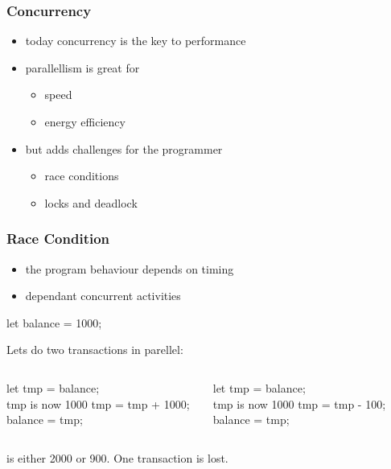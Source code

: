 \begin{frame}[fragile] \frametitle{Concurrency}
\begin{itemize}
  \item today concurrency is the key to performance
  \item parallellism is great for
  \begin{itemize}
    \item speed
    \item energy efficiency
  \end{itemize}
  \item but adds challenges for the programmer
  \begin{itemize}
    \item race conditions
    \item locks and deadlock
  \end{itemize}
\end{itemize}
\end{frame}

\begin{frame}[fragile] \frametitle{Race Condition}
\begin{itemize}
  \item the program behaviour depends on timing
  \item dependant concurrent activities
\end{itemize}
\vspace{3mm}

\begin{CodeBox}{}
let balance = 1000;
\end{CodeBox}
Lets do two transactions in parellel:
  \begin{columns}[onlytextwidth]
    \begin{column}{0.4\textwidth}
      \begin{CodeBox}{}
let tmp = balance;
\\ tmp is now 1000
tmp = tmp + 1000;
balance = tmp;
      \end{CodeBox}
    \end{column}
  \begin{column}{0.55\textwidth}
    \begin{CodeBox}{}
let tmp = balance;
\\ tmp is now 1000
tmp = tmp - 100;
balance = tmp;
      \end{CodeBox}
    \end{column}
    \begin{column}{0.3\textwidth}  \end{column}
  \end{columns}%
\vspace{3mm}
 is either 2000 or 900. One transaction is lost.
\end{frame}

